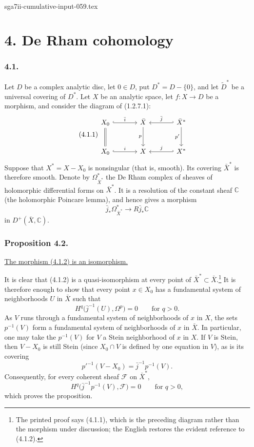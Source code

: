\begin{filecontents*}{sga7ii-cumulative-input-059.tex}
\section*{4. De Rham cohomology}

\subsubsection*{4.1.}
Let $D$ be a complex analytic disc, let $0\in D$, put
$D^*=D-\{0\}$, and let $\widetilde D^*$ be a universal covering of
$D^*$.  Let $X$ be an analytic space, let
$f:X\longrightarrow D$ be a morphism, and consider the diagram of
(1.2.7.1):
\begin{equation}\tag{4.1.1}
\begin{tikzcd}[column sep=large,row sep=large]
X_0 \arrow[r,hook,"\bar i"] \arrow[d,equal]
  & \bar X \arrow[d,"p"']
  & \bar X^* \arrow[l,hook',"\bar j"'] \arrow[d,"p'"'] \\
X_0 \arrow[r,hook,"i"]
  & X
  & X^* \arrow[l,hook',"j"']
\end{tikzcd}
\end{equation}
Suppose that $X^*=X-X_0$ is nonsingular (that is, smooth).  Its
covering $\bar X^*$ is therefore smooth.  Denote by
$\Omega_{\bar X^*}^*$ the De Rham complex of sheaves of holomorphic
differential forms on $\bar X^*$.  It is a resolution of the constant
sheaf $\mathbb C$ (the holomorphic Poincare lemma), and hence gives a
morphism
\begin{equation}\tag{4.1.2}
\bar j_*\Omega_{\bar X^*}^*
\longrightarrow R\bar j_*\mathbb C
\end{equation}
in $D^+(\bar X,\mathbb C)$.

\subsubsection*{Proposition 4.2.}
\underline{The morphism (4.1.2) is an isomorphism.}

It is clear that (4.1.2) is a quasi-isomorphism at every point of
$\bar X^*\subset\bar X$.\footnote{The printed proof says (4.1.1),
which is the preceding diagram rather than the morphism under
discussion; the English restores the evident reference to (4.1.2).}
It is therefore enough to show that every point $x\in X_0$ has a
fundamental system of neighborhoods $U$ in $\bar X$ such that
\[
H^q\bigl(\bar j^{-1}(U),\Omega^p\bigr)=0
\qquad\text{for }q>0.
\]
As $V$ runs through a fundamental system of neighborhoods of $x$ in
$X$, the sets $p^{-1}(V)$ form a fundamental system of neighborhoods
of $x$ in $\bar X$.  In particular, one may take the $p^{-1}(V)$ for
$V$ a Stein neighborhood of $x$ in $X$.  If $V$ is Stein, then
$V-X_0$ is still Stein (since $X_0\cap V$ is defined by one equation
in $V$), as is its covering
\[
p'^{-1}(V-X_0)=\bar j^{-1}p^{-1}(V).
\]
Consequently, for every coherent sheaf $\mathcal F$ on $\bar X^*$,
\[
H^q\bigl(\bar j^{-1}p^{-1}(V),\mathcal F\bigr)=0
\qquad\text{for }q>0,
\]
which proves the proposition.


\end{filecontents*}
